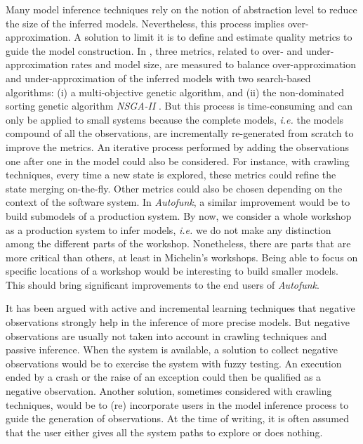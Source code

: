 Many model inference techniques rely on the notion of abstraction
level to reduce the size of the inferred models. Nevertheless,
this process implies over-approximation. A solution to limit it
is to define and estimate quality metrics
\cite{tonella2012finding,Lo20122063} to guide the model
construction. In \cite{tonella2012finding}, three metrics,
related to over- and under-approximation rates and model size,
are measured to balance over-approximation and
under-approximation of the inferred models with two search-based
algorithms: (i) a multi-objective genetic algorithm, and (ii) the
non-dominated sorting genetic algorithm \textit{NSGA-II}
\cite{deb2002fast}. But
this process is time-consuming and can only be applied to small
systems because the complete models, \emph{i.e.} the models compound of
all the observations, are incrementally re-generated from scratch
to improve the metrics.  An iterative process performed by adding
the observations one after one in the model could also be
considered. For instance, with crawling techniques, every time a
new state is explored, these metrics could refine the state
merging on-the-fly. Other metrics could also be chosen depending
on the context of the software system. In \textit{Autofunk}, a
similar improvement would be to build submodels of a production
system. By now, we consider a whole workshop as a production
system to infer models, \emph{i.e.} we do not make any distinction among
the different parts of the workshop. Nonetheless, there are parts
that are more critical than others, at least in Michelin's
workshops. Being able to focus on specific locations of a
workshop would be interesting to build smaller models. This
should bring significant improvements to the end users of
\textit{Autofunk}.

It has been argued with active and incremental learning
techniques that negative observations strongly help in the
inference of more precise models. But negative observations are
usually not taken into account in crawling techniques and passive
inference. When the system is available, a solution to collect
negative observations would be to exercise the system with fuzzy
testing. An execution ended by a crash or the raise of an
exception could then be qualified as a negative observation.
Another solution, sometimes considered with crawling techniques,
would be to (re) incorporate users in the model inference process
to guide the generation of observations. At the time of writing,
it is often assumed that the user either gives all the system
paths to explore or does nothing.

